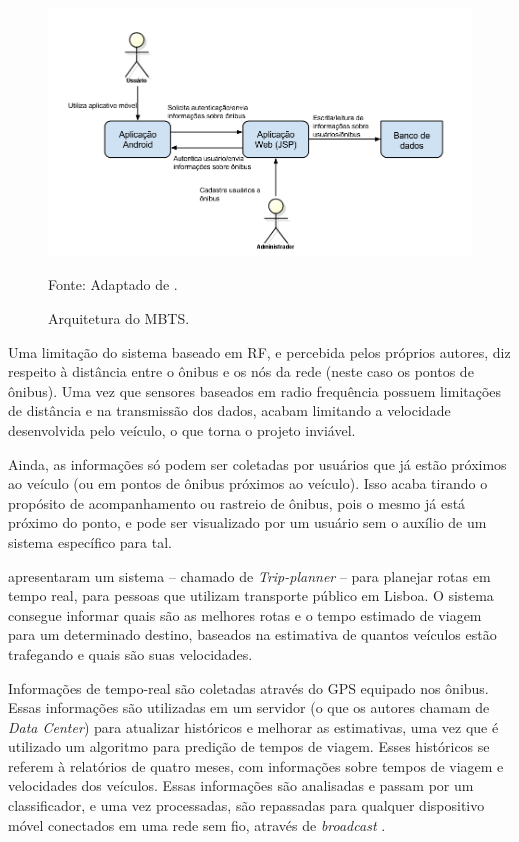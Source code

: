 \begin{figure}[h]
\begin{center}
    \includegraphics[width=1\columnwidth]{../figs/arquitetura_mbts.png}
    \caption{Arquitetura do MBTS.}Fonte: Adaptado de .
    \label{fig:archMBTS}
\end{center}
\end{figure}

Uma limitação do sistema baseado em RF, e percebida pelos próprios autores, diz respeito à distância entre o ônibus e os nós da rede (neste caso os pontos de ônibus). Uma vez que sensores baseados em radio frequência possuem limitações de distância e na transmissão dos dados, acabam limitando a velocidade desenvolvida pelo veículo, o que torna o projeto inviável. 

Ainda, as informações só podem ser coletadas por usuários que já estão próximos ao veículo (ou em pontos de ônibus próximos ao veículo). Isso acaba tirando o propósito de acompanhamento ou rastreio de ônibus, pois o mesmo já está próximo do ponto, e pode ser visualizado por um usuário sem o auxílio de um sistema específico para tal.

 apresentaram um sistema -- chamado de \emph{Trip-planner} -- para planejar rotas em tempo real, para pessoas que utilizam transporte público em Lisboa. O sistema consegue informar quais são as melhores rotas e o tempo estimado de viagem para um determinado destino, baseados na estimativa de quantos veículos estão trafegando e quais são suas velocidades.

Informações de tempo-real são coletadas através do GPS equipado nos ônibus. Essas informações são utilizadas em um servidor (o que os autores chamam de \emph{Data Center}) para atualizar históricos e melhorar as estimativas, uma vez que é utilizado um algoritmo para predição de tempos de viagem. Esses históricos se referem à relatórios de quatro meses, com informações sobre tempos de viagem e velocidades dos veículos. Essas informações são analisadas e passam por um classificador, e uma vez processadas, são repassadas para qualquer dispositivo móvel conectados em uma rede sem fio, através de \emph{broadcast} \cite{alves}.

